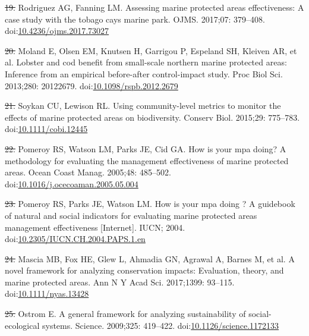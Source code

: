 \documentclass[12pt,]{article}
\providecommand{\DIFaddtex}[1]{{\protect\color{blue}\uwave{#1}}} %
\providecommand{\DIFdeltex}[1]{{\protect\color{red}\sout{#1}}}                      %
\providecommand{\DIFaddbegin}{} %
\providecommand{\DIFaddend}{} %
\providecommand{\DIFdelbegin}{} %
\providecommand{\DIFdelend}{} %
\providecommand{\DIFadd}[1]{\texorpdfstring{\DIFaddtex{#1}}{#1}} %
\providecommand{\DIFdel}[1]{\texorpdfstring{\DIFdeltex{#1}}{}} %
\newcommand{\DIFscaledelfig}{0.5}
\newlength{\DIFdelgraphicswidth} %
\newlength{\DIFdelgraphicsheight} %
\newcommand{\DIFaddincludegraphics}[2][]{{\color{blue}\fbox{\DIFOincludegraphics[#1]{#2}}}} %
\newcommand{\DIFdelincludegraphics}[2][]{%
\sbox{\DIFdelgraphicsbox}{\DIFOincludegraphics[#1]{#2}}%
\settoboxwidth{\DIFdelgraphicswidth}{\DIFdelgraphicsbox} %
\settoboxtotalheight{\DIFdelgraphicsheight}{\DIFdelgraphicsbox} %
\scalebox{\DIFscaledelfig}{%
\parbox[b]{\DIFdelgraphicswidth}{\usebox{\DIFdelgraphicsbox}\\[-\baselineskip] \rule{\DIFdelgraphicswidth}{0em}}\llap{\resizebox{\DIFdelgraphicswidth}{\DIFdelgraphicsheight}{%
\setlength{\unitlength}{\DIFdelgraphicswidth}%
\begin{picture}(1,1)%
\thicklines\linethickness{2pt} %
{\color[rgb]{1,0,0}\put(0,0){\framebox(1,1){}}}%
{\color[rgb]{1,0,0}\put(0,0){\line( 1,1){1}}}%
{\color[rgb]{1,0,0}\put(0,1){\line(1,-1){1}}}%
\end{picture}%
}\hspace*{3pt}}} %
} %
\DeclareRobustCommand{\DIFaddbegin}{\DIFOaddbegin \let\includegraphics\DIFaddincludegraphics} %
\DeclareRobustCommand{\DIFaddend}{\DIFOaddend \let\includegraphics\DIFOincludegraphics} %
\DeclareRobustCommand{\DIFdelbegin}{\DIFOdelbegin \let\includegraphics\DIFdelincludegraphics} %
\DeclareRobustCommand{\DIFdelend}{\DIFOaddend \let\includegraphics\DIFOincludegraphics} %
\begin{document}
\hypertarget{ref-rodriguez_2017-PD}{}
\DIFdelbegin \DIFdel{19. }\DIFdelend \DIFaddbegin \DIFadd{20. }\DIFaddend Rodriguez AG, Fanning LM. Assessing marine protected areas
effectiveness: A case study with the tobago cays marine park. OJMS.
2017;07: 379--408.
doi:\href{https://doi.org/10.4236/ojms.2017.73027}{10.4236/ojms.2017.73027}

\hypertarget{ref-moland_2013-VP}{}
\DIFdelbegin \DIFdel{20. }\DIFdelend \DIFaddbegin \DIFadd{21. }\DIFaddend Moland E, Olsen EM, Knutsen H, Garrigou P, Espeland SH, Kleiven AR,
et al. Lobster and cod benefit from small-scale northern marine
protected areas: Inference from an empirical before-after control-impact
study. Proc Biol Sci. 2013;280: 20122679.
doi:\href{https://doi.org/10.1098/rspb.2012.2679}{10.1098/rspb.2012.2679}

\hypertarget{ref-soykan_2015-nu}{}
\DIFdelbegin \DIFdel{21. }\DIFdelend \DIFaddbegin \DIFadd{22. }\DIFaddend Soykan CU, Lewison RL. Using community-level metrics to monitor the
effects of marine protected areas on biodiversity. Conserv Biol.
2015;29: 775--783.
doi:\href{https://doi.org/10.1111/cobi.12445}{10.1111/cobi.12445}

\hypertarget{ref-pomeroy_2005-Py}{}
\DIFdelbegin \DIFdel{22. }\DIFdelend \DIFaddbegin \DIFadd{23. }\DIFaddend Pomeroy RS, Watson LM, Parks JE, Cid GA. How is your mpa doing? A
methodology for evaluating the management effectiveness of marine
protected areas. Ocean Coast Manag. 2005;48: 485--502.
doi:\href{https://doi.org/10.1016/j.ocecoaman.2005.05.004}{10.1016/j.ocecoaman.2005.05.004}

\hypertarget{ref-pomeroy_2004-23}{}
\DIFdelbegin \DIFdel{23. }\DIFdelend \DIFaddbegin \DIFadd{24. }\DIFaddend Pomeroy RS, Parks JE, Watson LM. How is your mpa doing ? A guidebook
of natural and social indicators for evaluating marine protected areas
management effectiveness {[}Internet{]}. IUCN; 2004.
doi:\href{https://doi.org/10.2305/IUCN.CH.2004.PAPS.1.en}{10.2305/IUCN.CH.2004.PAPS.1.en}

\hypertarget{ref-mascia_2017-m_}{}
\DIFdelbegin \DIFdel{24. }\DIFdelend \DIFaddbegin \DIFadd{25. }\DIFaddend Mascia MB, Fox HE, Glew L, Ahmadia GN, Agrawal A, Barnes M, et al. A
novel framework for analyzing conservation impacts: Evaluation, theory,
and marine protected areas. Ann N Y Acad Sci. 2017;1399: 93--115.
doi:\href{https://doi.org/10.1111/nyas.13428}{10.1111/nyas.13428}

\hypertarget{ref-ostrom_2009-hg}{}
\DIFdelbegin \DIFdel{25. }\DIFdelend \DIFaddbegin \DIFadd{26. }\DIFaddend Ostrom E. A general framework for analyzing sustainability of
social-ecological systems. Science. 2009;325: 419--422.
doi:\href{https://doi.org/10.1126/science.1172133}{10.1126/science.1172133}
\end{document}
